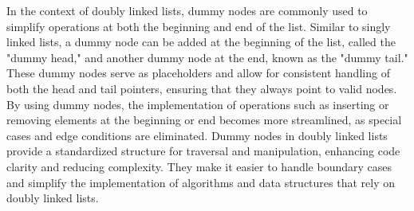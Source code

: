 In the context of doubly linked lists, dummy nodes are commonly used to simplify operations at both the beginning and end of the list. Similar to singly linked lists, a dummy node can be added at the beginning of the list, called the "dummy head," and another dummy node at the end, known as the "dummy tail." These dummy nodes serve as placeholders and 
allow for consistent handling of both the head and tail pointers, ensuring that they always point to valid nodes. By using dummy nodes, the implementation of operations such as inserting or removing elements at the beginning or end becomes more streamlined, as special cases and edge conditions are eliminated. Dummy nodes in doubly linked lists provide 
a standardized structure for traversal and manipulation, enhancing code clarity and reducing complexity. They make it easier to handle boundary cases and simplify the implementation of algorithms and data structures that rely on doubly linked lists.

